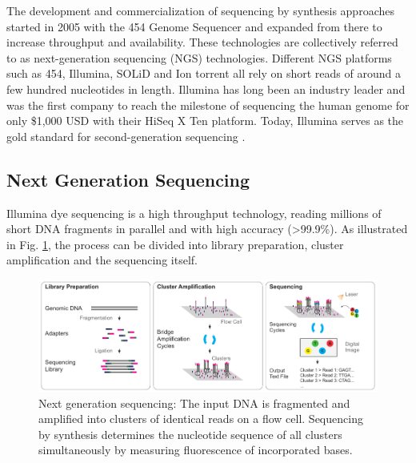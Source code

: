 The development and commercialization of sequencing by synthesis approaches started in 2005 with the 454 Genome Sequencer and expanded from there to increase throughput and availability. 
These technologies are collectively referred to as next-generation sequencing (NGS) technologies.
Different NGS platforms such as 454, Illumina, SOLiD and Ion torrent all rely on short reads of around a few hundred nucleotides in length. 
Illumina has long been an industry leader and was the first company to reach the milestone of sequencing the human genome for only \$1,000 USD with their HiSeq X Ten platform. Today, Illumina serves as the gold standard for second-generation sequencing \cite{Dijk2014}. 

\subsection{Next Generation Sequencing}
\label{subsec:intro:ngs}

Illumina dye sequencing is a high throughput technology, reading millions of short DNA fragments in parallel and with high accuracy (>99.9\%).
As illustrated in Fig. \ref{fig:intro:sbs}, the process can be divided into library preparation, cluster amplification and the sequencing itself.

\begin{figure}[h]
	\centering
	\includegraphics[width=1.0\textwidth]{figures/intro/sbs.pdf}
	\captionsetup{format=plain}
	\caption[Sequencing by synthesis]{Next generation sequencing: The input DNA is fragmented and amplified into clusters of identical reads on a flow cell. Sequencing by synthesis determines the nucleotide sequence of all clusters simultaneously by measuring fluorescence of incorporated bases.}
	\label{fig:intro:sbs}
\end{figure}

